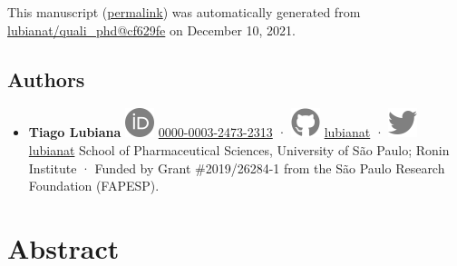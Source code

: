 This manuscript
(\href{https://lubianat.github.io/quali_phd/v/cf629fe1f70f8f676f43e4ec04950c65a9674e6f/}{permalink})
was automatically generated
from \href{https://github.com/lubianat/quali_phd/tree/cf629fe1f70f8f676f43e4ec04950c65a9674e6f}{lubianat/quali\_phd@cf629fe}
on December 10, 2021.

\hypertarget{authors}{%
\subsection{Authors}\label{authors}}

\begin{itemize}
\tightlist
\item
  \textbf{Tiago Lubiana}
  \includegraphics{images/orcid.svg}
  \href{https://orcid.org/0000-0003-2473-2313}{0000-0003-2473-2313}
  · \includegraphics{images/github.svg}
  \href{https://github.com/lubianat}{lubianat}
  · \includegraphics{images/twitter.svg}
  \href{https://twitter.com/lubianat}{lubianat}
  School of Pharmaceutical Sciences, University of São Paulo; Ronin Institute
  · Funded by Grant \#2019/26284-1 from the São Paulo Research Foundation (FAPESP).
\end{itemize}

\hypertarget{abstract}{%
\section{Abstract}\label{abstract}}

